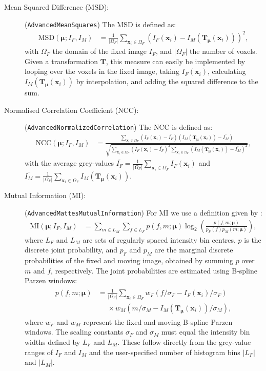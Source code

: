 \documentclass[]{report}
\newcommand{\vx}{\bm{x}}
\newcommand{\vmu}{\bm{\mu}}
\newcommand{\vT}{\bm{T}}
\newcommand{\vTm}{\bm{T}_{\vmu}}
\newcommand\relphantom[1]{\mathrel{\phantom{#1}}}
\begin{document}
\begin{description}
\item[Mean Squared Difference (MSD):] (\texttt{AdvancedMeanSquares})
The MSD is defined as:
\begin{align}
\mathrm{MSD}(\vmu;I_F,I_M) &= \frac{1}{|\Omega_F|}
\sum\limits_{\vx_i \in \Omega_F} \left( I_F(\vx_i) -
I_M(\vT_{\vmu}(\vx_i)) \right)^2,\label{eq:ssd}
\end{align}
with $\Omega_F$ the domain of the fixed image $I_F$, and
$|\Omega_F|$ the number of voxels. Given a transformation $\vT$,
this measure can easily be implemented by looping over the voxels
in the fixed image, taking $I_F(\vx_i)$, calculating
$I_M(\vT_{\vmu}(\vx_i))$ by interpolation, and adding the squared
difference to the sum.

\item[Normalised Correlation Coefficient (NCC):]
(\texttt{AdvancedNormalizedCorrelation}) The NCC is defined as:
\begin{align}
\mathrm{NCC}(\vmu;I_F,I_M) &= \frac{ \sum\limits_{\vx_i \in \Omega_F}
\left( I_F(\vx_i) - \overline{I_F} \right) \left( I_M(\vTm(\vx_i)) -
\overline{I_M} \right) }{ \sqrt{\sum\limits_{\vx_i \in \Omega_F}
\left( I_F(\vx_i) - \overline{I_F} \right)^2 \sum\limits_{\vx_i \in
\Omega_F} \left( I_M(\vTm(\vx_i)) - \overline{I_M} \right)^2}
},\label{eq:ncc}
\end{align}
with the average grey-values
$\overline{I_F}=\frac{1}{|\Omega_F|}\sum\limits_{\vx_i \in
\Omega_F} I_F(\vx_i)$ and
$\overline{I_M}=\frac{1}{|\Omega_F|}\sum\limits_{\vx_i \in
\Omega_F} I_M(\vT_{\vmu}(\vx_i))$.

\item[Mutual Information (MI):] (\texttt{AdvancedMattesMutualInformation})
For MI \citep{MaesEA97,ViolaEA97,MattesEA03} we use a definition
given by \citet{ThevenazEA00a}:
\begin{align}
\mathrm{MI}(\vmu; I_F, I_M) &=
 \sum\limits_{m\in L_M} \sum\limits_{f\in L_F}
 p(f,m;\vmu) \log_2
 \left( \frac{ p(f,m;\vmu) }{ p_F(f) p_M(m;\vmu)  }
 \right),\label{eq:MI}
\end{align}
where $L_F$ and $L_M$ are sets of regularly spaced intensity bin
centres, $p$ is the discrete joint probability, and $p_F$ and
$p_M$ are the marginal discrete probabilities of the fixed and
moving image, obtained by summing $p$ over $m$ and $f$,
respectively. The joint probabilities are estimated using B-spline
Parzen windows:
\begin{align}
\begin{split}
 p(f,m;\vmu) &=  \frac{1}{|\Omega_F|} \sum\limits_{\vx_i \in \Omega_F}
 w_F( f/\sigma_F - I_F(\vx_i)/\sigma_F ) \\
 &\relphantom{=}\times w_M( m/\sigma_M - I_M(\vTm(\vx_i))/\sigma_M ),
\end{split} \label{eq:histogram}
\end{align}
where $w_F$ and $w_M$ represent the fixed and moving B-spline
Parzen windows. The scaling constants $\sigma_F$ and $\sigma_M$
must equal the intensity bin widths defined by $L_F$ and $L_M$.
These follow directly from the grey-value ranges of $I_F$ and
$I_M$ and the user-specified number of histogram bins $|L_F|$ and
$|L_M|$.


\end{description}
\end{document}
